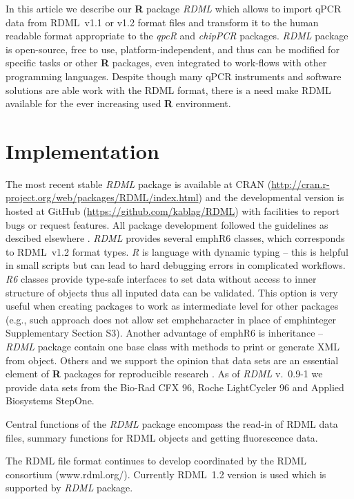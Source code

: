 \documentclass{bioinfo}
\begin{document}
In this article we describe our \textbf{R} package \textit{RDML} which allows to 
import qPCR data from RDML~v1.1 or v1.2 format files and transform it to the human 
readable format appropriate to the \textit{qpcR} and \textit{chipPCR} packages. 
\textit{RDML} package is open-source, free to use, platform-independent, and 
thus can be modified for specific tasks or other \textbf{R} packages, even 
integrated to work-flows with other programming languages. Despite though many qPCR 
instruments and software solutions are able work with the RDML format, there is 
a need make RDML available for the ever increasing used \textbf{R} environment.

\section{Implementation}

The most recent stable \textit{RDML} package is available at CRAN 
(\url{http://cran.r-project.org/web/packages/RDML/index.html}) and the 
developmental version is hosted at GitHub (\url{https://github.com/kablag/RDML}) 
with facilities to report bugs or request features. All package development 
followed the guidelines as descibed elsewhere \cite{RDCT2014a}. \textit{RDML} provides several emph{R6} classes, which corresponds to RDML~v1.2 format types. \emph{R} is language with dynamic typing -- this is helpful in small scripts but can lead to hard debugging errors in complicated workflows. \emph{R6} classes provide type-safe interfaces to set data without access to inner structure of objects thus all inputed data can be validated. This option is very useful when creating packages to work as intermediate level for other packages (e.g., such approach does not allow set emph{character} in place of emph{integer} Supplementary Section S3). Another advantage of emph{R6} is inheritance -- \textit{RDML} package contain one base class with methods to print or generate XML from object. Others and we support the opinion that data sets are an essential element of \textbf{R} 
packages for reproducible research 
\cite{gentleman_2004,hofmann_2013,Leeper_2014}. As 
of \textit{RDML} v.~0.9-1 we provide data sets from the Bio-Rad CFX 96, Roche LightCycler 96 and Applied Biosystems StepOne.

Central functions of the \textit{RDML} package encompass the read-in of RDML 
data files, summary functions for RDML objects and getting fluorescence data.

The RDML file format continues to develop coordinated by the RDML consortium 
(www.rdml.org/). Currently RDML~1.2 version is used which is supported by \textit{RDML} package.
\end{document}
